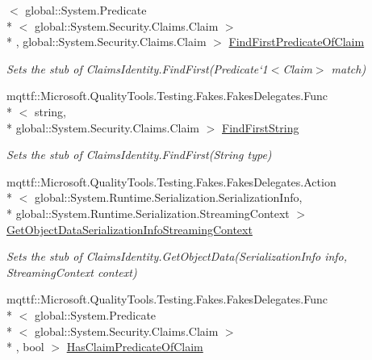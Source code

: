 \begin{DoxyCompactItemize}
$<$ global\-::\-System.\-Predicate\\*
$<$ global\-::\-System.\-Security.\-Claims.\-Claim $>$\\*
, global\-::\-System.\-Security.\-Claims.\-Claim $>$ \hyperlink{class_system_1_1_security_1_1_claims_1_1_fakes_1_1_stub_claims_identity_a5363db3429b26321785426e8931215d2}{Find\-First\-Predicate\-Of\-Claim}
\begin{DoxyCompactList}\small\item\em Sets the stub of Claims\-Identity.\-Find\-First(Predicate`1$<$Claim$>$ match)\end{DoxyCompactList}\item 
mqttf\-::\-Microsoft.\-Quality\-Tools.\-Testing.\-Fakes.\-Fakes\-Delegates.\-Func\\*
$<$ string, \\*
global\-::\-System.\-Security.\-Claims.\-Claim $>$ \hyperlink{class_system_1_1_security_1_1_claims_1_1_fakes_1_1_stub_claims_identity_aa98f7874dacb23bdbdd1501d9483e943}{Find\-First\-String}
\begin{DoxyCompactList}\small\item\em Sets the stub of Claims\-Identity.\-Find\-First(\-String type)\end{DoxyCompactList}\item 
mqttf\-::\-Microsoft.\-Quality\-Tools.\-Testing.\-Fakes.\-Fakes\-Delegates.\-Action\\*
$<$ global\-::\-System.\-Runtime.\-Serialization.\-Serialization\-Info, \\*
global\-::\-System.\-Runtime.\-Serialization.\-Streaming\-Context $>$ \hyperlink{class_system_1_1_security_1_1_claims_1_1_fakes_1_1_stub_claims_identity_a6c772057dbeca1f288c36913094d3518}{Get\-Object\-Data\-Serialization\-Info\-Streaming\-Context}
\begin{DoxyCompactList}\small\item\em Sets the stub of Claims\-Identity.\-Get\-Object\-Data(\-Serialization\-Info info, Streaming\-Context context)\end{DoxyCompactList}\item 
mqttf\-::\-Microsoft.\-Quality\-Tools.\-Testing.\-Fakes.\-Fakes\-Delegates.\-Func\\*
$<$ global\-::\-System.\-Predicate\\*
$<$ global\-::\-System.\-Security.\-Claims.\-Claim $>$\\*
, bool $>$ \hyperlink{class_system_1_1_security_1_1_claims_1_1_fakes_1_1_stub_claims_identity_ac1854b3a8ed168fa643429c30b17da6e}{Has\-Claim\-Predicate\-Of\-Claim}

\end{DoxyCompactItemize}
